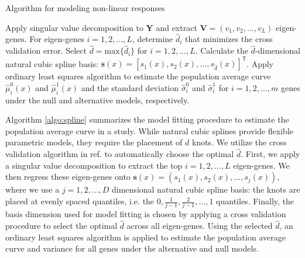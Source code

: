 \documentclass[11pt]{article}
\begin{document}
\begin{algorithm}[!t] 
 \caption{Algorithm for modeling non-linear responses
  \label{algo:spline}
 }
  Apply singular value decomposition to $\mathbf{Y}$ and extract $\mathbf{V} = (v_{1}, v_{2}, ..., v_{L})$ eigen-genes. \;
  For eigen-genes $i=1,2,...,L$, determine $\hat{d}_{i}$ that minimizes the cross validation error.\;
  Select $\hat{d} = \text{max}\{ \hat{d}_{i} \}$ for $i = 1,2,...,L$.\;
  Calculate the $\hat{d}$-dimensional natural cubic spline basis: $\mathbf{s}(x) = [s_{1}(x), s_{2}(x), ..., s_{\hat{d}}(x)]^{\mathsf{T}}$. \;
  Apply ordinary least squares algorithm to estimate the population average curve $\hat{\mu}^{0}_{i}(x)$ and $\hat{\mu}^{1}_{i}(x)$ and the standard deviation $\hat{\sigma}^{0}_{i}$ and $\hat{\sigma}^{1}_{i}$ for $i=1,2,...,m$ genes under the null and alternative models, respectively. \;
\end{algorithm}

Algorithm \ref{algo:spline} summarizes the model fitting procedure to estimate the population average curve in a study. While natural cubic splines provide flexible parametric models, they require the placement of $d$ knots. We utilize the cross validation algorithm in ref. \citep{Storey_2005_time} to automatically choose the optimal $\hat{d}$. First, we apply a singular value decomposition to extract the top $i = 1, 2, ..., L$ eigen-genes. We then regress these eigen-genes onto $\mathbf{s}(x) = (s_{1}(x), s_{2}(x), ..., s_{j}(x))$, where we use a $j = 1,2, ..., D$ dimensional natural cubic spline basis: the knots are placed at evenly spaced quantiles, i.e. the $0, \frac{1}{j-1}, \frac{2}{j-1}, ..., 1$ quantiles. Finally, the basis dimension used for model fitting is chosen by applying a cross validation procedure to select the optimal $\hat{d}$ across all eigen-genes. Using the selected $\hat{d}$, an ordinary least squares algorithm is applied to estimate the population average curve and variance for all genes under the alternative and null models.
\end{document}
